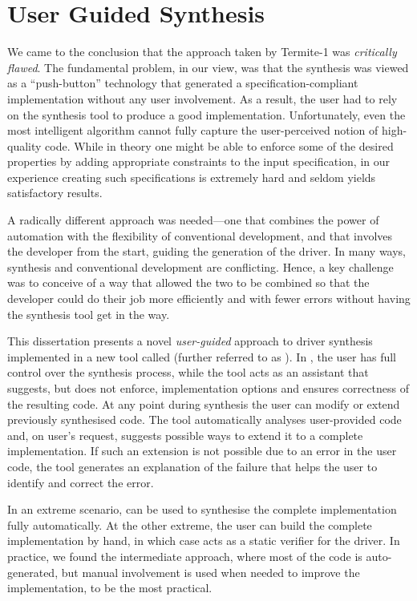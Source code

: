 \section{User Guided Synthesis}

We came to the conclusion that the approach taken by Termite-1 was \emph{critically flawed}.  The fundamental problem, in our view, was that the synthesis was viewed as a ``push-button'' technology that generated a specification-compliant implementation without any user involvement.  As a result, the user had to rely on the synthesis tool to produce a good implementation.  Unfortunately, even the most intelligent algorithm cannot fully capture the user-perceived notion of high-quality code.  While in theory one might be able to enforce some of the desired properties by adding appropriate constraints to the input specification, in our experience creating such specifications is extremely hard and seldom yields satisfactory results.

A radically different approach was needed---one that combines the power of automation with the flexibility of conventional development, and that involves the developer from the start, guiding the generation of the driver.  In many ways, synthesis and conventional development are conflicting.  Hence, a key challenge was to conceive of a way that allowed the two to be combined so that the developer could do their job more efficiently and with fewer errors without having the synthesis tool get in the way.

This dissertation presents a novel \emph{user-guided} approach to driver synthesis implemented in a new tool called  (further referred to as \termite).  In \termite, the user has full control over the synthesis process, while the tool acts as an assistant that suggests, but does not enforce, implementation options and ensures correctness of the resulting code.  At any point during synthesis the user can modify or extend previously synthesised code.  The tool automatically analyses user-provided code and, on user's request, suggests possible ways to extend it to a complete implementation.  If such an extension is not possible due to an error in the user code, the tool generates an explanation of the failure that helps the user to identify and correct the error.

In an extreme scenario, \termite can be used to synthesise the complete implementation fully automatically.  At the other extreme, the user can build the complete implementation by hand, in which case \termite acts as a static verifier for the driver.  In practice, we found the intermediate approach, where most of the code is auto-generated, but manual involvement is used when needed to improve the implementation, to be the most practical.

